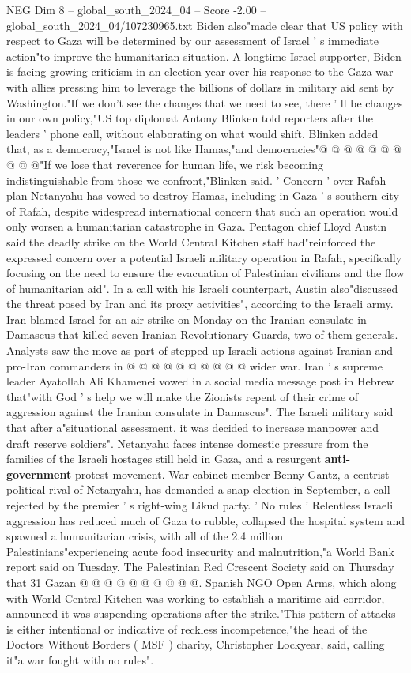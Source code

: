 \begin{textsample}{NEG Dim 8 – global\_south\_2024\_04 – Score -2.00 – global\_south\_2024\_04/107230965.txt}
Biden also"made clear that US policy with respect to Gaza will be determined by our assessment of Israel ' s immediate action"to improve the humanitarian situation.
A longtime Israel supporter, Biden is facing growing criticism in an election year over his response to the Gaza war -- with allies pressing him to leverage the billions of dollars in military aid sent by Washington."If we don't see the changes that we need to see, there ' ll be changes in our own policy,"US top diplomat Antony Blinken told reporters after the leaders ' phone call, without elaborating on what would shift.
Blinken added that, as a democracy,"Israel is not like Hamas,"and democracies"@ @ @ @ @ @ @ @ @ @"If we lose that reverence for human life, we risk becoming indistinguishable from those we confront,"Blinken said. ' Concern ' over Rafah plan Netanyahu has vowed to destroy Hamas, including in Gaza ' s southern city of Rafah, despite widespread international concern that such an operation would only worsen a humanitarian catastrophe in Gaza.
Pentagon chief Lloyd Austin said the deadly strike on the World Central Kitchen staff had"reinforced the expressed concern over a potential Israeli military operation in Rafah, specifically focusing on the need to ensure the evacuation of Palestinian civilians and the flow of humanitarian aid".
In a call with his Israeli counterpart, Austin also"discussed the threat posed by Iran and its proxy activities", according to the Israeli army.
Iran blamed Israel for an air strike on Monday on the Iranian consulate in Damascus that killed seven Iranian Revolutionary Guards, two of them generals.
Analysts saw the move as part of stepped-up Israeli actions against Iranian and pro-Iran commanders in @ @ @ @ @ @ @ @ @ @ wider war.
Iran ' s supreme leader Ayatollah Ali Khamenei vowed in a social media message post in Hebrew that"with God ' s help we will make the Zionists repent of their crime of aggression against the Iranian consulate in Damascus".
The Israeli military said that after a"situational assessment, it was decided to increase manpower and draft reserve soldiers".
Netanyahu faces intense domestic pressure from the families of the Israeli hostages still held in Gaza, and a resurgent \textbf{anti-government} protest movement.
War cabinet member Benny Gantz, a centrist political rival of Netanyahu, has demanded a snap election in September, a call rejected by the premier ' s right-wing Likud party. ' No rules ' Relentless Israeli aggression has reduced much of Gaza to rubble, collapsed the hospital system and spawned a humanitarian crisis, with all of the 2.4 million Palestinians"experiencing acute food insecurity and malnutrition,"a World Bank report said on Tuesday.
The Palestinian Red Crescent Society said on Thursday that 31 Gazan @ @ @ @ @ @ @ @ @ @.
Spanish NGO Open Arms, which along with World Central Kitchen was working to establish a maritime aid corridor, announced it was suspending operations after the strike."This pattern of attacks is either intentional or indicative of reckless incompetence,"the head of the Doctors Without Borders ( MSF ) charity, Christopher Lockyear, said, calling it"a war fought with no rules".

\end{textsample}

